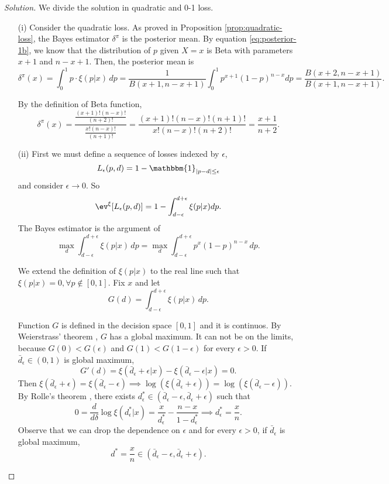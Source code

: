 \begin{proof}[Solution]
    We divide the solution in quadratic and 0-1 loss. 
    \begin{enumerate}
        \item[(i)] Consider the quadratic loss. As proved in Proposition \ref{prop:quadratic-loss}, the Bayes estimator $\delta^{\pi}$ is the
        posterior mean. By equation \ref{eq:posterior-1b}, we know that the
        distribution of $p$ given $X = x$ is Beta with parameters $x+1$ and
        $n-x+1$. Then, the posterior mean is 
        $$
        \delta^{\pi}(x) = \int_0^1 p \cdot\xi(p|x) \, dp = \frac{1}{B(x+1,n-x+1)}\int_0^1 p ^{x+1}(1-p)^{n-x} dp =  \frac{B(x+2,n-x+1)}{B(x+1,n-x+1)}.
        $$

        By the definition of Beta function, 
        $$
        \delta^{\pi}(x) = \frac{\frac{(x+1)!(n-x)!}{(n+2)!}}{\frac{x!(n-x)!}{(n+1)!}} = \frac{(x+1)!(n-x)!(n+1)!}{x!(n-x)!(n+2)!} = \frac{x+1}{n+2}.
        $$

        \item[(ii)] First we must define a sequence of losses indexed by
        $\epsilon$, 
        $$
        L_{\epsilon}(p, d) = 1 - \mathbbm{1}_{|p-d| \le \epsilon}
        $$
        and consider $\epsilon \to 0$. So 
        $$
        \ev^{\xi}[L_{\epsilon}(p, d)] = 1 - \int_{d - \epsilon}^{d + \epsilon} \xi(p|x) dp.
        $$
        The Bayes estimator is the argument of $$\max_d \int_{d - \epsilon}^{d
        + \epsilon} \xi(p|x) \, dp = \max_d \int_{d-\epsilon}^{d + \epsilon}
        p^x(1-p)^{n-x}\, dp.$$

        We extend the definition of $\xi(p|x)$ to the real line such
        that $\xi(p|x) = 0, \forall p \not\in [0,1]$. Fix $x$ and let 
        $$G(d) = \int_{d-\epsilon}^{d + \epsilon}
        \xi(p|x)\, dp.$$ 
        
        Function $G$ is defined in the decision space $[0,1]$ and it is
        continuos. By Weierstrass' theorem \cite{weierstrass}, $G$ has a global maximum. It can
        not be on the limits, because $G(0) < G(\epsilon)$ and $G(1) < G(1 - \epsilon)$
        for every $\epsilon > 0$. If $\bar{d}_{\epsilon} \in (0,1)$ is global maximum, 
        $$
        G'(d) = \xi(\bar{d}_{\epsilon}+\epsilon|x) - \xi(\bar{d}_{\epsilon}-\epsilon|x) = 0.
        $$
        Then $\xi(\bar{d}_{\epsilon} + \epsilon) = \xi(\bar{d}_{\epsilon} - \epsilon) \implies
        \log(\xi(\bar{d}_{\epsilon} + \epsilon)) = \log(\xi(\bar{d}_{\epsilon} - \epsilon))$. By
        Rolle's theorem \cite{rolle}, there exists $d^{*}_{\epsilon} \in
        (\bar{d}_{\epsilon} - \epsilon, \bar{d}_{\epsilon} + \epsilon)$ such
        that 
        $$
        0 = \frac{d}{d \delta} \log \xi(d^{*}_{\epsilon}|x) = \frac{x}{d^{*}_{\epsilon}} - \frac{n-x}{1 - d^{*}_{\epsilon}} \implies d^{*}_{\epsilon} = \frac{x}{n}.
        $$
        Observe that we can drop the dependence on $\epsilon$ and for every $\epsilon > 0$, if $\bar{d}_{\epsilon}$ is global
        maximum, 
        $$d^* = \frac{x}{n} \in (\bar{d}_{\epsilon} - \epsilon,
        \bar{d}_{\epsilon} + \epsilon).$$        


\end{enumerate}
\end{proof}
